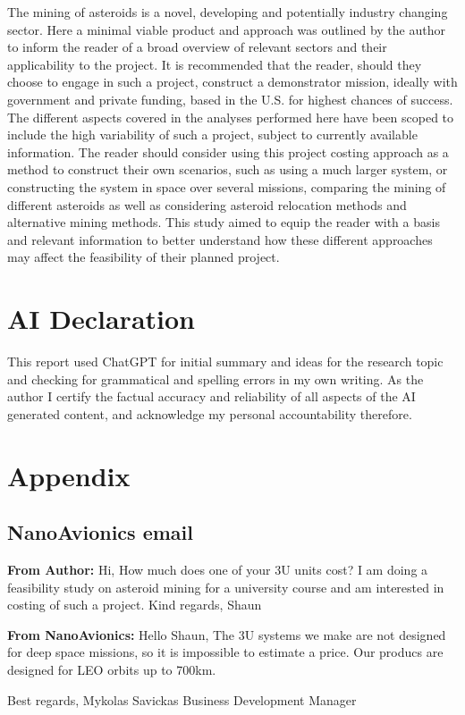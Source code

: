 \documentclass[conference]{IEEEtran}
\begin{document}
The mining of asteroids is a novel, developing and potentially industry changing sector. Here a minimal viable product and approach was outlined by the author to inform the reader of a broad overview of relevant sectors and their applicability to the project. It is recommended that the reader, should they choose to engage in such a project, construct a demonstrator mission, ideally with government and private funding, based in the U.S. for highest chances of success. The different aspects covered in the analyses performed here have been scoped to include the high variability of such a project, subject to currently available information. The reader should consider using this project costing approach as a method to construct their own scenarios, such as using a much larger system, or constructing the system in space over several missions, comparing the mining of different asteroids as well as considering asteroid relocation methods and alternative mining methods. This study aimed to equip the reader with a basis and relevant information to better understand how these different approaches may affect the feasibility of their planned project.

\section{AI Declaration}
This report used ChatGPT for initial summary and ideas for the research topic and checking for grammatical and spelling errors in my own writing. As the author I certify the factual accuracy and reliability of all aspects of the AI generated content, and acknowledge my personal accountability therefore.

\section{Appendix}
\subsection{NanoAvionics email}\label{apdx:email}

\textbf{From Author:}
Hi, 
How much does one of your 3U units cost? I am doing a feasibility study on asteroid mining for a university course and am interested in costing of such a project. Kind regards, Shaun

\textbf{From NanoAvionics:}
Hello Shaun,
The 3U systems we make are not designed for deep space missions, so it is impossible to estimate a price. Our producs are designed for LEO orbits up to 700km.

Best regards,
Mykolas Savickas
Business Development Manager

 

\end{document}
